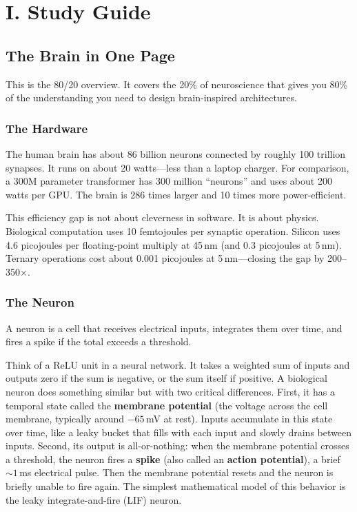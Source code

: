 \documentclass[11pt,a4paper]{article}
\begin{document}

\section{I. Study Guide}


\subsection{The Brain in One Page}

This is the 80/20 overview. It covers the 20\% of neuroscience that gives you 80\% of the understanding you need to design brain-inspired architectures.

\subsubsection{The Hardware}

The human brain has about 86 billion neurons connected by roughly 100 trillion synapses. It runs on about 20 watts---less than a laptop charger. For comparison, a 300M parameter transformer has 300 million ``neurons'' and uses about 200 watts per GPU. The brain is 286 times larger and 10 times more power-efficient.

This efficiency gap is not about cleverness in software. It is about physics. Biological computation uses 10 femtojoules per synaptic operation. Silicon uses 4.6 picojoules per floating-point multiply at 45\,nm (and 0.3 picojoules at 5\,nm). Ternary operations cost about 0.001 picojoules at 5\,nm---closing the gap by 200--350$\times$.

\subsubsection{The Neuron}

A neuron is a cell that receives electrical inputs, integrates them over time, and fires a spike if the total exceeds a threshold.

Think of a ReLU unit in a neural network. It takes a weighted sum of inputs and outputs zero if the sum is negative, or the sum itself if positive. A biological neuron does something similar but with two critical differences. First, it has a temporal state called the \textbf{membrane potential} (the voltage across the cell membrane, typically around $-65$\,mV at rest). Inputs accumulate in this state over time, like a leaky bucket that fills with each input and slowly drains between inputs. Second, its output is all-or-nothing: when the membrane potential crosses a threshold, the neuron fires a \textbf{spike} (also called an \textbf{action potential}), a brief ${\sim}1$\,ms electrical pulse. Then the membrane potential resets and the neuron is briefly unable to fire again. The simplest mathematical model of this behavior is the leaky integrate-and-fire (LIF) neuron.
\end{document}
